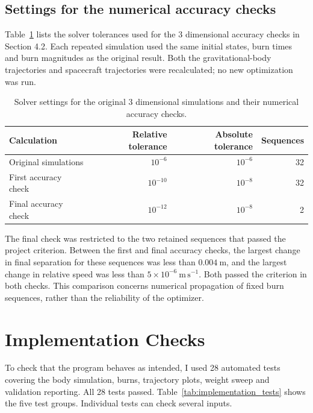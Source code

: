 \documentclass[11pt,letterpaper]{article}
\begin{document}
\subsection{Settings for the numerical accuracy checks}
Table~\ref{tab:tolerance_settings} lists the solver tolerances used for
the 3 dimensional accuracy checks in Section 4.2. Each repeated
simulation used the same initial states, burn times and burn magnitudes
as the original result. Both the gravitational-body trajectories and
spacecraft trajectories were recalculated; no new optimization was run.

\begin{table}[htbp]
\centering
\caption{Solver settings for the original 3 dimensional simulations and
their numerical accuracy checks.}
\label{tab:tolerance_settings}
\begin{tabular}{lrrr}
\toprule
Calculation & Relative tolerance & Absolute tolerance & Sequences\\
\midrule
Original simulations & $10^{-6}$ & $10^{-6}$ & 32\\
First accuracy check & $10^{-10}$ & $10^{-8}$ & 32\\
Final accuracy check & $10^{-12}$ & $10^{-8}$ & 2\\
\bottomrule
\end{tabular}
\end{table}

The final check was restricted to the two retained sequences that passed the
project criterion. Between the first and final accuracy checks, the
largest change in final separation for these sequences was less than
$0.004\ \mathrm{m}$, and the largest change in relative speed was less
than $5\times10^{-6}\ \mathrm{m\,s^{-1}}$. Both passed the criterion
in both checks. This comparison concerns numerical propagation of
fixed burn sequences, rather than the reliability of the optimizer.

\clearpage
\section{Implementation Checks}
\label{app:implementation_checks}
To check that the program behaves as intended, I used 28 automated
tests covering the body simulation, burns, trajectory plots, weight
sweep and validation reporting. All 28 tests passed. Table~\ref{tab:implementation_tests}
shows the five test groups. Individual tests can check several inputs.
\end{document}
